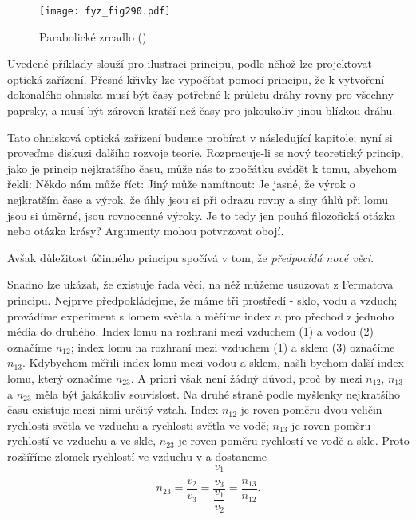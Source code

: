     \begin{figure}[ht!] %
      \centering
      \texttt{[image: fyz\_fig290.pdf]}
      \caption{Parabolické zrcadlo
               (\cite[s.~352]{Feynman01})}
      \label{fyz:fig290}
    \end{figure}

    Uvedené příklady slouží pro ilustraci principu, podle něhož lze projektovat optická zařízení. 
    Přesné křivky lze vypočítat pomocí principu, že k vytvoření dokonalého ohniska musí být časy 
    potřebné k průletu dráhy rovny pro všechny paprsky, a musí být zároveň kratší než časy pro 
    jakoukoliv jinou blízkou dráhu.
    
    Tato ohnisková optická zařízení budeme probírat v následující kapitole; nyní si proveďme 
    diskuzi dalšího rozvoje teorie. Rozpracuje-li se nový teoretický princip, jako je princip 
    nejkratšího času, může nás to zpočátku svádět k tomu, abychom řekli:  Někdo nám 
    může říct:  Jiný může namítnout:  Je jasné, že výrok o nejkratším čase a výrok, že 
    úhly jsou si při odrazu rovny a siny úhlů při lomu jsou si úměrné, jsou rovnocenné výroky. Je 
    to tedy jen pouhá filozofická otázka nebo otázka krásy? Argumenty mohou potvrzovat obojí. 
    
    Avšak důležitost účinného principu spočívá v tom, že \emph{předpovídá nové věci}. 
    
    Snadno lze ukázat, že existuje řada věcí, na něž můžeme usuzovat z Fermatova principu. Nejprve 
    předpokládejme, že máme tři prostředí - sklo, vodu a vzduch; provádíme experiment s lomem 
    světla a měříme index \(n\) pro přechod z jednoho média do druhého. Index lomu na rozhraní mezi 
    vzduchem (1) a vodou (2) označíme \(n_{12}\); index lomu na rozhraní mezi vzduchem (1) a sklem 
    (3) označíme \(n_{13}\). Kdybychom měřili index lomu mezi vodou a sklem, našli bychom další 
    index lomu, který označíme \(n_{23}\). A priori však není žádný důvod, proč by mezi \(n_{12}\), 
    \(n_{13}\) a \(n_{23}\) měla být jakákoliv souvislost. Na druhé straně podle myšlenky 
    nejkratšího času existuje mezi nimi určitý vztah. Index \(n_{12}\) je roven poměru dvou veličin 
    - rychlosti světla ve vzduchu a rychlosti světla ve vodě; \(n_{13}\) je roven poměru rychlostí 
    ve vzduchu a ve skle, \(n_{23}\) je roven poměru rychlostí ve vodě a skle. Proto rozšíříme 
    zlomek rychlostí ve vzduchu v a dostaneme
    \begin{equation}\label{fyz:eq357}
      n_{23} = \frac{v_2}{v_3} = \dfrac{\dfrac{v_1}{v_3}}{\dfrac{v_1}{v_2}} = \frac{n_{13}}{n_{12}}.
    \end{equation}
    
